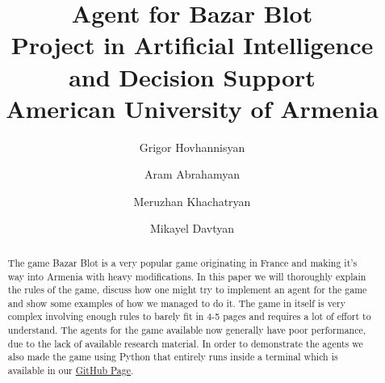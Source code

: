 \documentclass[a4paper,12pt]{article}
\title{
    Agent for Bazar Blot \\
        \large Project in Artificial Intelligence and Decision Support \\ American University of Armenia \\
}
\author{Grigor Hovhannisyan
\and
Aram Abrahamyan
\and
Meruzhan Khachatryan
\and
Mikayel Davtyan
}
\begin{document}
\pagecolor{black}
\color{white}

{ %
\maketitle\thispagestyle{empty}
\vspace{1cm}{}
}
\vspace{1cm}


{
    \newpage
    \hypersetup{linkcolor=white} %
    \tableofcontents
}

\newpage
{}
\begin{abstract}
    The game Bazar Blot is a very popular game originating in France and making it's way into Armenia with heavy modifications.
    In this paper we will thoroughly explain the rules of the game, discuss how one might try to implement an agent for the game and show some examples of how we managed to do it.
    The game in itself is very complex involving enough rules to barely fit in 4-5 pages and requires a lot of effort to understand.
    The agents for the game available now generally have poor performance, due to the lack of available research material.
    In order to demonstrate the agents we also made the game using Python that entirely runs inside a terminal which is available in our \href{https://github.com/aramabrahamyan1703/BeloteAI}{GitHub Page}.
\end{abstract}

\newpage
\pagestyle{fancy} %
\lhead{\nouppercase{\rightmark}}
\rhead{}









\newpage
\thispagestyle{SectionFirstPage} %
\rhead{}
\renewcommand\refname{References}
\printbibliography
\end{document}
